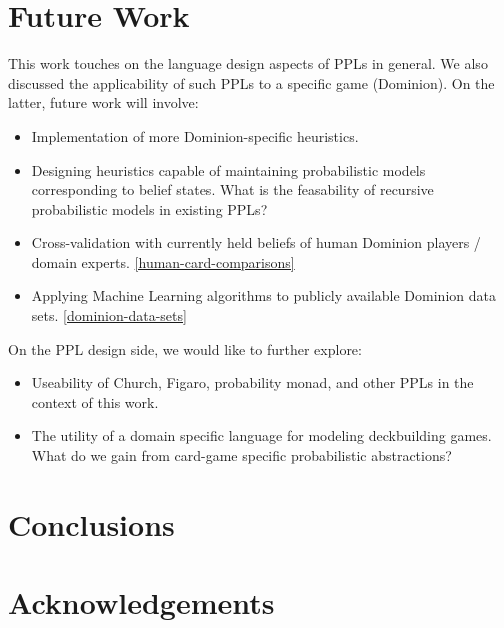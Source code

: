 
\section{Future Work} \label{sec:future}

This work touches on the language design aspects of PPLs
in general. We also discussed the applicability of such PPLs
to a specific game (Dominion). On the latter, future work
will involve:

\begin{itemize}
\item Implementation of more Dominion-specific heuristics.
\item Designing heuristics capable of maintaining probabilistic models
      corresponding to belief states. What is the feasability of recursive
      probabilistic models in existing PPLs?
\item Cross-validation with currently held beliefs of human Dominion
      players / domain experts. \ref{human-card-comparisons}
\item Applying Machine Learning algorithms to publicly available Dominion
      data sets. \ref{dominion-data-sets}
\end{itemize}

On the PPL design side, we would like to further explore:

\begin{itemize}
\item Useability of Church, Figaro, probability monad, and other
      PPLs in the context of this work.
\item The utility of a domain specific language for modeling deckbuilding
      games. What do we gain from card-game specific probabilistic
      abstractions?
\end{itemize}

\section{Conclusions} \label{sec:conc}

\section{Acknowledgements} \label{sec:ack}

